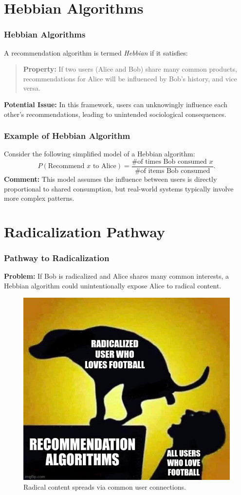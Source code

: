 \documentclass[
	11pt, %
]{beamer}
\begin{document}
\section{Hebbian Algorithms}
\begin{frame}
    \frametitle{Hebbian Algorithms}
    A recommendation algorithm is termed \emph{Hebbian} if it satisfies:
    \begin{quote}
        \textbf{Property:} If two users (Alice and Bob) share many common products, recommendations for Alice will be influenced by Bob’s history, and vice versa.
    \end{quote}
    \vspace{0.2cm}
    \textbf{Potential Issue:} In this framework, users can unknowingly influence each other's recommendations, leading to unintended sociological consequences.
\end{frame}

\begin{frame}
    \frametitle{Example of Hebbian Algorithm}
    Consider the following simplified model of a Hebbian algorithm:
    \[
    P(\text{Recommend } x \text{ to Alice}) = \frac{\text{\# of times Bob consumed } x}{\text{\# of items Bob consumed}}.
    \]
    \vspace{0.3cm}
    \textbf{Comment:} This model assumes the influence between users is directly proportional to shared consumption, but real-world systems typically involve more complex patterns.
\end{frame}


\section{Radicalization Pathway}
\begin{frame}
    \frametitle{Pathway to Radicalization}
    \textbf{Problem:} If Bob is radicalized and Alice shares many common interests, a Hebbian algorithm could unintentionally expose Alice to radical content.
    
    \begin{figure}
		\includegraphics[width=0.5\linewidth]{947x9m.jpg}
		\caption{Radical content spreads via common user connections.}
	\end{figure}
\end{frame}
\end{document}
